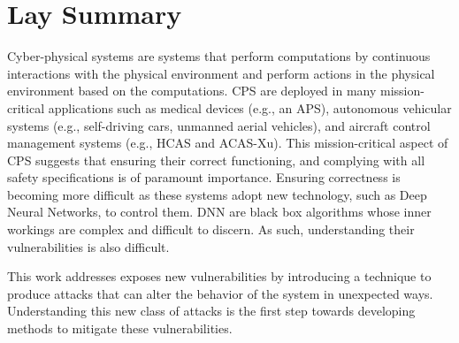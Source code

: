 

\chapter{Lay Summary}

Cyber-physical systems are systems that perform computations by continuous interactions with the physical environment and perform actions in the physical environment based on the computations. 
\ac{CPS} are deployed in many mission-critical applications such as medical devices (e.g., an \ac{APS}), autonomous vehicular systems (e.g., self-driving cars, unmanned aerial vehicles), and aircraft control management systems (e.g.,  \ac{HCAS} and \ac{ACAS-Xu}). 
This mission-critical aspect of CPS suggests that ensuring their correct functioning, and complying with all safety specifications is of paramount importance. 
Ensuring correctness is becoming more difficult as these systems adopt new technology, such as Deep Neural Networks, to control them. 
\ac{DNN} are black box algorithms whose inner workings are complex and difficult to discern.
As such, understanding their vulnerabilities is also difficult. 

This work addresses exposes new vulnerabilities by introducing a  technique to produce attacks that can alter the behavior of the system in unexpected ways. 
Understanding this new class of attacks is the first step towards developing methods to mitigate these vulnerabilities. 



 



